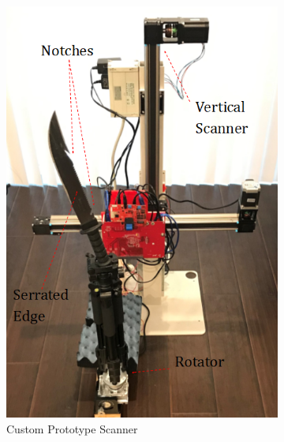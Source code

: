 \documentclass[conference]{IEEEtran}
\begin{document}
		\begin{figure} [h]
			\begin{subfigure}{.5\linewidth}
				\centering
				\includegraphics[width=1\linewidth]{../Figures/Scanner Photos/RSAR Scanner}
				\caption{Custom Prototype Scanner}
				\label{fig:scanner}
			\end{subfigure}%
			\begin{subfigure}{.5\linewidth}
				\centering

\end{subfigure}
\end{figure}
\end{document}

